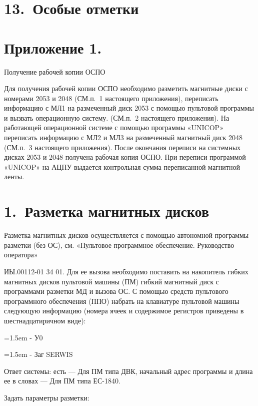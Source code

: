 \documentclass[11pt,a4paper]{article}
\begin{document}
\section*{13.~Особые отметки}
\section*{Приложение 1.}
\begin{center}Получение рабочей копии ОСПО\end{center}
Для получения рабочей копии ОСПО необходимо разметить магнитные диски с номерами 2053 и 2048 (СМ.п.~1 настоящего приложения), переписать информацию с МЛ1 на размеченный диск 2053 с помощью пультовой программы и вызвать операционную систему. (СМ.п.~2 настоящего приложения). На работающей операционной системе с помощью программы «UNICOP» переписать информацию с МЛ2 и МЛ3 на размеченный магнитный диск 2048 (СМ.п.~3 настоящего приложения). После окончания переписи на системных дисках 2053 и 2048 получена рабочая копия ОСПО. При переписи программой «UNICOP» на АЦПУ выдается контрольная сумма переписанной магнитной ленты.

\section*{1.~Разметка магнитных дисков}
Разметка магнитных дисков осуществляется с помощью автономной программы разметки (без ОС), см. «Пультовое программное обеспечение. Руководство оператора»

ИЫ.00112-01 34 01. Для ее вызова необходимо поставить на накопитель гибких магнитных дисков пультовой машины (ПМ) гибкий магнитный диск с программами разметки МД и вызова ОС. С помощью средств пультового программного обеспечения (ППО) набрать на клавиатуре пультовой машины следующую информацию (номера ячеек и содержимое регистров приведены в шестнадцатиричном виде):

\par\hangindent=1.5em - У0\par
\par\hangindent=1.5em - Заг SERWIS\par
Ответ системы: есть --- Для ПМ типа ДВК, начальный адрес программы и длина ее в словах --- Для ПМ типа ЕС-1840.

Задать параметры разметки:
\end{document}
